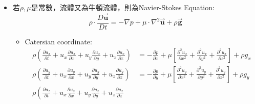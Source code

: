 \documentclass[../main.tex]{subfiles}
\begin{document}
\begin{itemize}
\begin{itemize}
\begin{align}
          + \frac{\left(\tau_{\theta r} - \tau_{r\theta}\right)-\tau_{\phi\phi}\cot\theta}{r}
        \right] + \rho g_{\theta} \\
        &\rho\left(
          \frac{\partial u_{\phi}}{\partial t}  + u_r\frac{\partial u_{\phi}}{\partial r} 
          + \frac{u_{\theta}}{r}\frac{\partial u_{\phi}}{\partial \theta} 
          + \frac{u_{\phi}}{r\sin\theta}\frac{\partial u_{\phi}}{\partial \phi}
          + \frac{u_r u_{\phi} + u_{\theta}u_{\phi}\cot\theta}{r}
        \right) = - \frac{1}{r\sin\theta}\frac{\partial p}{\partial \phi} \nonumber\\
        &\phantom{\rho}-\left[
          \frac{1}{r^3}\frac{\partial}{\partial r}\left(r^3\tau_{r\phi}\right)
          + \frac{1}{r\sin\theta}\frac{\partial}{\partial \theta}\left(\tau_{\theta\phi}\sin\theta\right)
          + \frac{1}{r\sin\theta}\frac{\partial}{\partial \phi}\tau_{\phi\phi}
          + \frac{\left(\tau_{\phi r} - \tau_{r\phi}\right)-\tau_{\phi\theta}\cot\theta}{r}
        \right] + \rho g_{\phi}
    \end{align}
  \end{itemize}
  \item 若$\rho,\mu$是常數，流體又為牛頓流體，則為Navier-Stokes Equation:
    \begin{equation}
      \rho \cdot \frac{D\vec {\bm u}}{Dt} = -\nabla p + \mu\cdot \nabla^2 \vec {\bm u} + \rho \vec {\bm g}
    \end{equation}
    \begin{itemize}
      \item Catersian coordinate:
        \begin{align}
          \rho\left(
            \frac{\partial u_x}{\partial t} + u_x\frac{\partial u_x}{\partial x} + u_y\frac{\partial u_x}{\partial y} + u_z\frac{\partial u_x}{\partial z}
          \right) &= -\frac{\partial p}{\partial x} + \mu\left[
            \frac{\partial^2 u_x}{\partial x^2} + \frac{\partial^2 u_x}{\partial y^2} + \frac{\partial^2 u_x}{\partial z^2}
          \right] + \rho g_x \\
          \rho\left(
            \frac{\partial u_y}{\partial t} + u_x\frac{\partial u_y}{\partial x} + u_y\frac{\partial u_y}{\partial y} + u_z\frac{\partial u_y}{\partial z}
          \right) &= -\frac{\partial p}{\partial y} + \mu\left[
            \frac{\partial^2 u_y}{\partial x^2} + \frac{\partial^2 u_y}{\partial y^2} + \frac{\partial^2 u_y}{\partial z^2}
          \right] + \rho g_y \\
          \rho\left(
            \frac{\partial u_z}{\partial t} + u_x\frac{\partial u_z}{\partial x} + u_y\frac{\partial u_z}{\partial y} + u_z\frac{\partial u_z}{\partial z}

\end{align}
\end{itemize}
\end{itemize}
\end{document}
